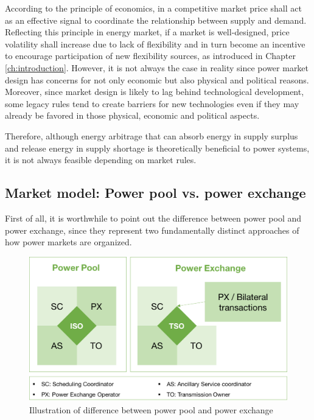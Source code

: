 According to the principle of economics, in a competitive market price shall act as an effective signal to coordinate the relationship between supply and demand. Reflecting this principle in energy market, if a market is well-designed, price volatility shall increase due to lack of flexibility and in turn become an incentive to encourage participation of new flexibility sources, as introduced in Chapter \ref{ch:introduction}. However, it is not always the case in reality since power market design has concerns for not only economic but also physical and political reasons. Moreover, since market design is likely to lag behind technological development, some legacy rules tend to create barriers for new technologies even if they may already be favored in those physical, economic and political aspects.

Therefore, although energy arbitrage that can absorb energy in supply surplus and release energy in supply shortage is theoretically beneficial to power systems, it is not always feasible depending on market rules. 

\subsection{Market model: Power pool vs. power exchange}

First of all, it is worthwhile to point out the difference between power pool and power exchange, since they represent two fundamentally distinct approaches of how power markets are organized. 

\begin{figure}[h!]
	\centering
	\includegraphics[width=0.95\linewidth]{Figures/PowerPoolExchange}
	\caption{Illustration of difference between power pool and power exchange}
	\label{fig:pppx}
\end{figure}

